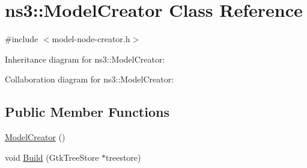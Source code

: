 \hypertarget{classns3_1_1ModelCreator}{}\section{ns3\+:\+:Model\+Creator Class Reference}
\label{classns3_1_1ModelCreator}


{\ttfamily \#include $<$model-\/node-\/creator.\+h$>$}



Inheritance diagram for ns3\+:\+:Model\+Creator\+:


Collaboration diagram for ns3\+:\+:Model\+Creator\+:
\subsection*{Public Member Functions}
\begin{DoxyCompactItemize}
\item 
\hyperlink{classns3_1_1ModelCreator_a0e8fee85f4824d953c0135f42927720a}{Model\+Creator} ()
\item 
void \hyperlink{classns3_1_1ModelCreator_a8103a829286a73b9988d1dfc018c9819}{Build} (Gtk\+Tree\+Store $\ast$treestore)
\end{DoxyCompactItemize}
